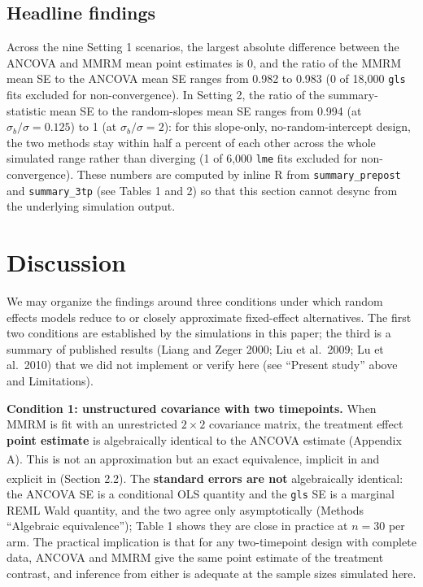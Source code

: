 \documentclass[
  11pt,
]{article}
\begin{document}
\FloatBarrier

\subsection{Headline findings}\label{headline-findings}

Across the nine Setting 1 scenarios, the largest
absolute difference between the ANCOVA and MMRM mean
point estimates is 0, and the ratio of
the MMRM mean SE to the ANCOVA mean SE ranges from
0.982 to 0.983
(0 of 18,000 \texttt{gls} fits excluded for
non-convergence). In Setting 2, the ratio of the
summary-statistic mean SE to the random-slopes mean SE
ranges from 0.994 (at
\(\sigma_b/\sigma = 0.125\)) to 1
(at \(\sigma_b/\sigma = 2\)): for this slope-only,
no-random-intercept design, the two methods stay within
half a percent of each other across the whole simulated
range rather than diverging
(1 of 6,000 \texttt{lme} fits excluded for
non-convergence). These numbers are computed by inline
R from \texttt{summary\_prepost} and \texttt{summary\_3tp} (see Tables 1
and 2) so that this section cannot desync from the
underlying simulation output.

\section{Discussion}\label{discussion}

We may organize the findings around three conditions under which
random effects models reduce to or closely approximate
fixed-effect alternatives. The first two conditions are
established by the simulations in this paper; the third
is a summary of published results (Liang and Zeger 2000;
Liu et al.~2009; Lu et al.~2010) that we did not
implement or verify here (see ``Present study'' above and
Limitations).

\textbf{Condition 1: unstructured covariance with two
timepoints.} When MMRM is fit with an unrestricted
\(2 \times 2\) covariance matrix, the treatment effect
\textbf{point estimate} is algebraically identical to the
ANCOVA estimate (Appendix A). This is not an
approximation but an exact equivalence, implicit in\textsuperscript{} and explicit in\textsuperscript{}
(Section 2.2). The \textbf{standard errors are not}
algebraically identical: the ANCOVA SE is a conditional
OLS quantity and the \texttt{gls} SE is a marginal REML Wald
quantity, and the two agree only asymptotically (Methods
``Algebraic equivalence''); Table 1 shows they are close in
practice at \(n = 30\) per arm. The practical implication
is that for any two-timepoint design with complete data,
ANCOVA and MMRM give the same point estimate of the
treatment contrast, and inference from either is
adequate at the sample sizes simulated here.
\end{document}
